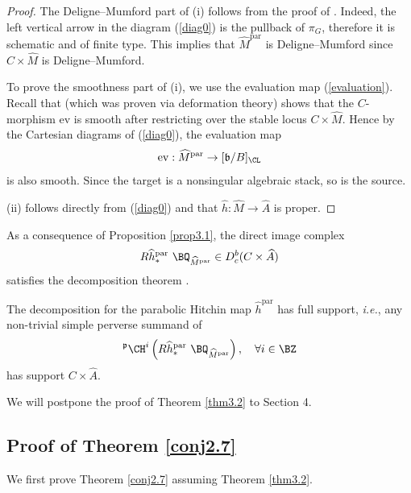 \begin{proof}
The Deligne--Mumford part of (i) follows from the proof of \cite[Proposition 2.5.1 (3)]{Yun1}. Indeed, the left vertical arrow in the diagram (\ref{diag0}) is the pullback of $\pi_G$, therefore it is schematic and of finite type. This implies that $\widehat{M}^{\mathrm{par}}$ is Deligne--Mumford since $C \times \widehat{M}$ is Deligne--Mumford.

To prove the smoothness part of (i), we use the evaluation map (\ref{evaluation}). Recall that \cite[Proposition 4.1]{MS} (which was proven via deformation theory) shows that the $C$-morphism $\mathrm{ev}$ is smooth after restricting over the stable locus $C \times \widehat{M}$. Hence by the Cartesian diagrams of (\ref{diag0}), the evaluation map
\[
\mathrm{ev}: \widehat{M}^{\mathrm{par}} \to {[\mathfrak{b}/B]_\CL}
\]
is also smooth. Since the target is a nonsingular algebraic stack, so is the source.

(ii) follows directly from (\ref{diag0}) and that $\widehat{h}: \widehat{M} \to \widehat{A}$ is proper.
\end{proof}

As a consequence of Proposition \ref{prop3.1}, the direct image complex
\[
R{\widehat{h}^{\mathrm{par}}}_* ~\BQ_{\widehat{M}^{\mathrm{par}}} \in D^b_c(C\times \widehat{A})
\]
satisfies the decomposition theorem \cite{BBD}.

\begin{thm}
\notready\label{thm3.2}
The decomposition for the parabolic Hitchin map $\widehat{h}^{\mathrm{par}}$ has full support, \emph{i.e.}, any non-trivial simple perverse summand of \[
^\mathfrak{p}\CH^i\left(R{\widehat{h}^{\mathrm{par}}}_* ~\BQ_{\widehat{M}^{\mathrm{par}}} \right), \quad  \forall i\in \BZ\]
has support $C\times \widehat{A}$.
\end{thm}

We will postpone the proof of Theorem \ref{thm3.2} to Section 4.


\subsection{Proof of Theorem \ref{conj2.7}}

We first prove Theorem \ref{conj2.7} assuming Theorem \ref{thm3.2}.

